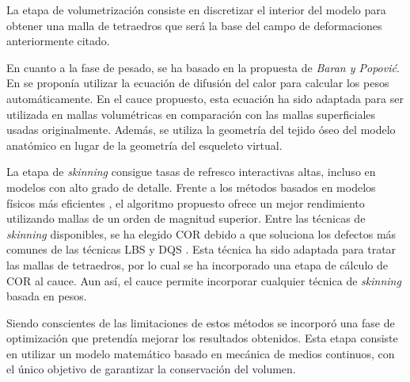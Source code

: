La etapa de volumetrización consiste en discretizar el interior del modelo para obtener una malla de tetraedros que será la base del campo de deformaciones anteriormente citado.

En cuanto a la fase de pesado, se ha basado en la propuesta de \emph{Baran y Popovi\'{c}}. En \cite{Baran:2007} se proponía utilizar la ecuación de difusión del calor para calcular los pesos automáticamente. En el cauce propuesto, esta ecuación ha sido adaptada para ser utilizada en mallas volumétricas en comparación con las mallas superficiales usadas originalmente. Además, se utiliza la geometría del tejido óseo del modelo anatómico en lugar de la geometría del esqueleto virtual.

La etapa de \emph{skinning} consigue tasas de refresco interactivas altas, incluso en modelos con alto grado de detalle. Frente a los métodos basados en modelos físicos más eficientes \cite{Bender:2014}, el algoritmo propuesto ofrece un mejor rendimiento utilizando mallas de un orden de magnitud superior. Entre las técnicas de \emph{skinning} disponibles, se ha elegido \ac{COR} \cite{le2016real} debido a que soluciona los defectos más comunes de las técnicas \ac{LBS} \cite{thalmann88} y \ac{DQS} \cite{Kavan2008}. Esta técnica ha sido adaptada para tratar las mallas de tetraedros, por lo cual se ha incorporado una etapa de cálculo de \acl{COR} al cauce. Aun así, el cauce permite incorporar cualquier técnica de \emph{skinning} basada en pesos.


Siendo conscientes de las limitaciones de estos métodos %
se incorporó una fase de optimización que pretendía mejorar los resultados obtenidos. Esta etapa consiste en utilizar un modelo matemático basado en mecánica de medios continuos, con el único objetivo de garantizar la conservación del volumen.

